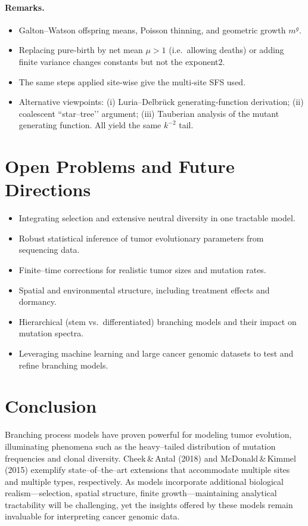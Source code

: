 \documentclass[11pt]{article}
\begin{document}
\paragraph{Remarks.}
\begin{itemize}\setlength\itemsep{2pt}
  \item Galton--Watson offspring means, Poisson thinning, and geometric growth $m^{g}$.
  \item Replacing pure‑birth by net mean $\mu>1$ (i.e.\ allowing deaths) or adding finite variance changes constants but not the exponent$2$.
  \item The same steps applied site‑wise give the multi‑site SFS used.
  \item Alternative viewpoints: (i) Luria--Delbrück generating‑function derivation; (ii) coalescent “star–tree’’ argument; (iii) Tauberian analysis of the mutant generating function. All yield the same $k^{-2}$ tail.
\end{itemize}


\section{Open Problems and Future Directions}
\begin{itemize}
 \item Integrating selection and extensive neutral diversity in one tractable model.
 \item Robust statistical inference of tumor evolutionary parameters from sequencing data.
 \item Finite--time corrections for realistic tumor sizes and mutation rates.
 \item Spatial and environmental structure, including treatment effects and dormancy.
 \item Hierarchical (stem vs.~differentiated) branching models and their impact on mutation spectra.
 \item Leveraging machine learning and large cancer genomic datasets to test and refine branching models.
\end{itemize}

\section{Conclusion}
Branching process models have proven powerful for modeling tumor evolution, illuminating phenomena such as the heavy--tailed distribution of mutation frequencies and clonal diversity. Cheek\,\&\,Antal (2018) and McDonald\,\&\,Kimmel (2015) exemplify state--of--the--art extensions that accommodate multiple sites and multiple types, respectively. As models incorporate additional biological realism---selection, spatial structure, finite growth---maintaining analytical tractability will be challenging, yet the insights offered by these models remain invaluable for interpreting cancer genomic data.
\end{document}
